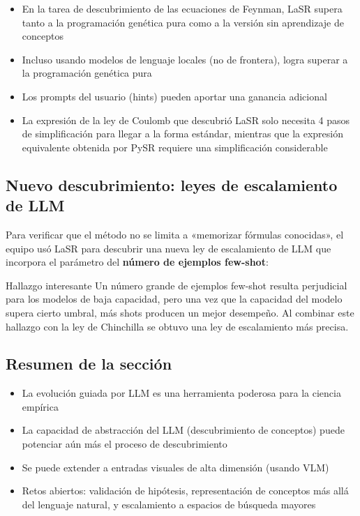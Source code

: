 \documentclass[a4paper]{article}
\begin{document}
\begin{itemize}
    \item En la tarea de descubrimiento de las ecuaciones de Feynman, LaSR supera tanto a la programación genética pura como a la versión sin aprendizaje de conceptos
    \item Incluso usando modelos de lenguaje locales (no de frontera), logra superar a la programación genética pura
    \item Los prompts del usuario (hints) pueden aportar una ganancia adicional
    \item La expresión de la ley de Coulomb que descubrió LaSR solo necesita 4 pasos de simplificación para llegar a la forma estándar, mientras que la expresión equivalente obtenida por PySR requiere una simplificación considerable
\end{itemize}

\subsection{Nuevo descubrimiento: leyes de escalamiento de LLM}

Para verificar que el método no se limita a «memorizar fórmulas conocidas», el equipo usó LaSR para descubrir una nueva ley de escalamiento de LLM que incorpora el parámetro del \textbf{número de ejemplos few-shot}:

\begin{warningbox}{Hallazgo interesante}
Un número grande de ejemplos few-shot resulta perjudicial para los modelos de baja capacidad, pero una vez que la capacidad del modelo supera cierto umbral, más shots producen un mejor desempeño. Al combinar este hallazgo con la ley de Chinchilla se obtuvo una ley de escalamiento más precisa.
\end{warningbox}

\subsection{Resumen de la sección}

\begin{itemize}
    \item La evolución guiada por LLM es una herramienta poderosa para la ciencia empírica
    \item La capacidad de abstracción del LLM (descubrimiento de conceptos) puede potenciar aún más el proceso de descubrimiento
    \item Se puede extender a entradas visuales de alta dimensión (usando VLM)
    \item Retos abiertos: validación de hipótesis, representación de conceptos más allá del lenguaje natural, y escalamiento a espacios de búsqueda mayores
\end{itemize}
\end{document}
